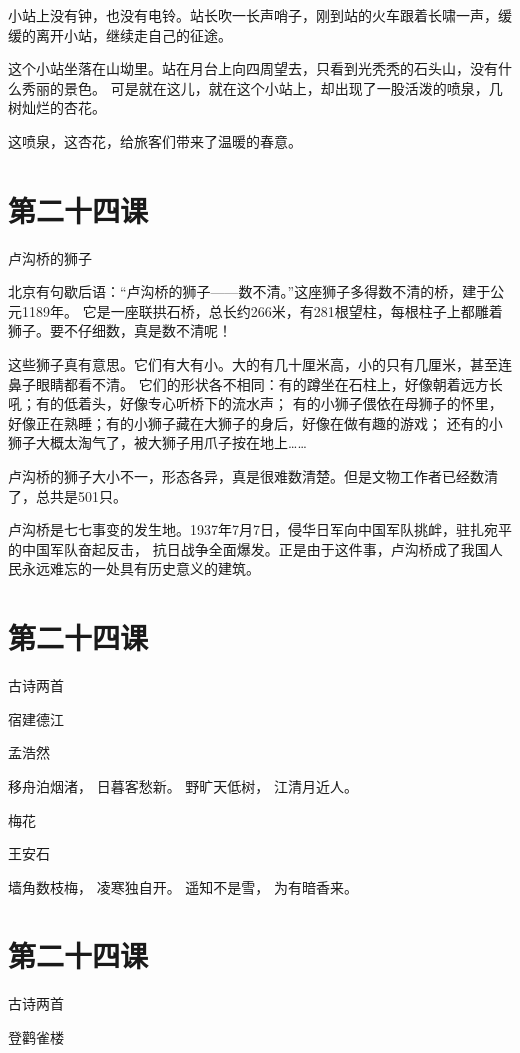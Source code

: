 \documentclass[12pt,UTF8]{ctexbook}
\begin{document}
小站上没有钟，也没有电铃。站长吹一长声哨子，刚到站的火车跟着长啸一声，缓缓的离开小站，继续走自己的征途。

这个小站坐落在山坳里。站在月台上向四周望去，只看到光秃秃的石头山，没有什么秀丽的景色。
可是就在这儿，就在这个小站上，却出现了一股活泼的喷泉，几树灿烂的杏花。

这喷泉，这杏花，给旅客们带来了温暖的春意。

\section{第二十四课}

卢沟桥的狮子

北京有句歇后语：“卢沟桥的狮子——数不清。”这座狮子多得数不清的桥，建于公元1189年。
它是一座联拱石桥，总长约266米，有281根望柱，每根柱子上都雕着狮子。要不仔细数，真是数不清呢！

这些狮子真有意思。它们有大有小。大的有几十厘米高，小的只有几厘米，甚至连鼻子眼睛都看不清。
它们的形状各不相同：有的蹲坐在石柱上，好像朝着远方长吼；有的低着头，好像专心听桥下的流水声；
有的小狮子偎依在母狮子的怀里，好像正在熟睡；有的小狮子藏在大狮子的身后，好像在做有趣的游戏；
还有的小狮子大概太淘气了，被大狮子用爪子按在地上……

卢沟桥的狮子大小不一，形态各异，真是很难数清楚。但是文物工作者已经数清了，总共是501只。

卢沟桥是七七事变的发生地。1937年7月7日，侵华日军向中国军队挑衅，驻扎宛平的中国军队奋起反击，
抗日战争全面爆发。正是由于这件事，卢沟桥成了我国人民永远难忘的一处具有历史意义的建筑。

\section{第二十四课}

古诗两首

宿建德江

孟浩然

移舟泊烟渚，
日暮客愁新。
野旷天低树，
江清月近人。

梅花

王安石

墙角数枝梅，
凌寒独自开。
遥知不是雪，
为有暗香来。

\section{第二十四课}

古诗两首

登鹳雀楼
\end{document}
